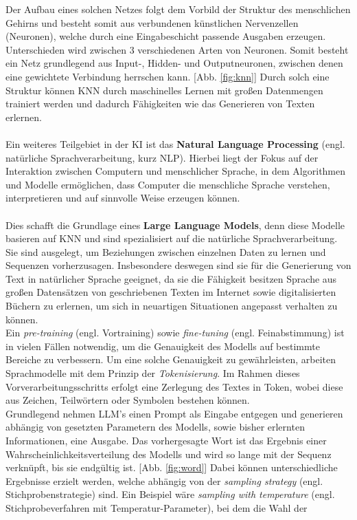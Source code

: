 Der Aufbau eines solchen Netzes folgt dem Vorbild der Struktur des menschlichen Gehirns und besteht somit aus verbundenen künstlichen Nervenzellen (Neuronen), welche durch eine Eingabeschicht passende Ausgaben erzeugen. \cite*{morrKuenstlicheNeuronaleNetze} Unterschieden wird zwischen 3 verschiedenen Arten von Neuronen. Somit besteht ein Netz grundlegend aus Input-, Hidden- und Outputneuronen, zwischen denen eine gewichtete Verbindung herrschen kann. \cite*{NeuronaleNetzeEinfuhrung} [Abb. \ref{fig:knn}] Durch solch eine Struktur können KNN durch maschinelles Lernen mit großen Datenmengen trainiert werden und dadurch Fähigkeiten wie das Generieren von Texten erlernen. \cite*{seemannKuenstlicheIntelligenzLarge}\\\\ Ein weiteres Teilgebiet in der KI ist das \textbf{Natural Language Processing} (engl. natürliche Sprachverarbeitung, kurz NLP). Hierbei liegt der Fokus auf der Interaktion zwischen Computern und menschlicher Sprache, in dem Algorithmen und Modelle ermöglichen, dass Computer die menschliche Sprache verstehen, interpretieren und auf sinnvolle Weise erzeugen können. \cite*{muruganNaturalLanguageProcessing2024} \\\\ Dies schafft die Grundlage eines \textbf{Large Language Models}, denn diese Modelle basieren auf KNN und sind spezialisiert auf die natürliche Sprachverarbeitung. \cite*{seemannKuenstlicheIntelligenzLarge} Sie sind ausgelegt, um Beziehungen zwischen einzelnen Daten zu lernen und Sequenzen vorherzusagen. Insbesondere deswegen sind sie für die Generierung von Text in natürlicher Sprache geeignet, da sie die Fähigkeit besitzen Sprache aus großen Datensätzen von geschriebenen Texten im Internet sowie digitalisierten Büchern zu erlernen, um sich in neuartigen Situationen angepasst verhalten zu können. \cite*{okerlundWhatChatterbox2022} \cite*{authorityofthehouseoflordsLargeLanguageModels} \\Ein \textit{pre-training} (engl. Vortraining) sowie \textit{fine-tuning} (engl. Feinabstimmung) ist in vielen Fällen notwendig, um die Genauigkeit des Modells auf bestimmte Bereiche zu verbessern. \cite{HowLLMsWork} Um eine solche Genauigkeit zu gewährleisten, arbeiten Sprachmodelle mit dem Prinzip der \textit{Tokenisierung}. Im Rahmen dieses Vorverarbeitungsschritts erfolgt eine Zerlegung des Textes in Token, wobei diese aus Zeichen, Teilwörtern oder Symbolen bestehen können. \cite*{naveedComprehensiveOverviewLarge2024} \\ Grundlegend nehmen LLM's einen Prompt als Eingabe entgegen und generieren abhängig von gesetzten Parametern des Modells, sowie bisher erlernten Informationen, eine Ausgabe. Das vorhergesagte Wort ist das Ergebnis einer Wahrscheinlichkeitsverteilung des Modells und wird so lange mit der Sequenz verknüpft, bis sie endgültig ist. [Abb. \ref{fig:word}] Dabei können unterschiedliche Ergebnisse erzielt werden, welche abhängig von der \textit{sampling strategy} (engl. Stichprobenstrategie) sind. \cite*{cholletDeepLearningPython2018} Ein Beispiel wäre \textit{sampling with temperature} (engl. Stichprobeverfahren mit Temperatur-Parameter), bei dem die Wahl der 